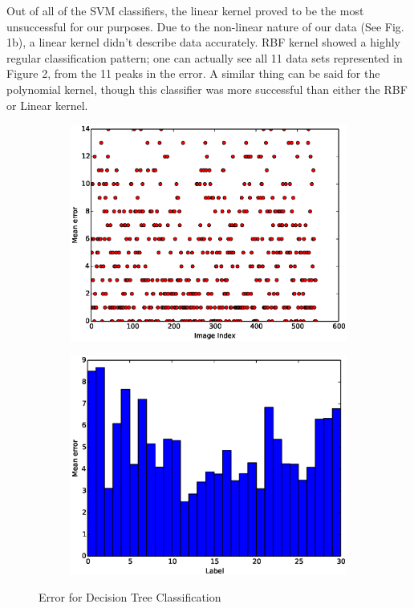 \documentclass{article}
\begin{document}
Out of all of the SVM classifiers, the linear kernel proved to be the most unsuccessful for our purposes. Due to the non-linear nature of our data (See Fig. 1b), a linear kernel didn't describe data accurately. RBF kernel showed a highly regular classification pattern; one can actually see all 11 data sets represented in Figure 2, from the 11 peaks in the error. A similar thing can be said for the polynomial kernel, though this classifier was more successful than either the RBF or Linear kernel. 

\begin{figure}[H]
  \begin{subfigure}[!h]{0.5\textwidth}
    \centering
    \includegraphics[width=\textwidth]{./woodley/Decision_tree_heading_plot.eps}
  \end{subfigure}
  \begin{subfigure}[!h]{0.5\textwidth}
    \centering
    \includegraphics[width=\textwidth]{./woodley/Decision_tree_heading_bar.eps}
  \end{subfigure}
  \caption{Error for Decision Tree Classification}
\end{figure}
\end{document}
